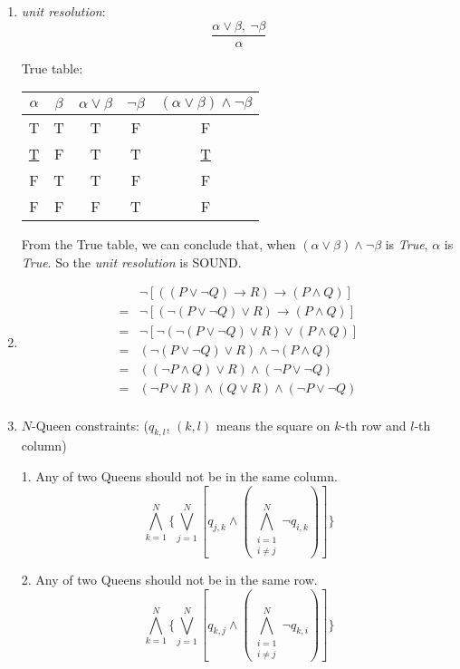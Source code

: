 \documentclass{article}
\begin{document}
\begin{enumerate}
\item \textit{unit resolution}: 
$$\frac{\alpha \lor \beta, \:\neg \beta}{\alpha}$$

True table: 
\begin{table}[ht]
\centering
\begin{tabular}{|c|c|c|c|c|}
\hline
$\alpha$ & $\beta$ & $\alpha \lor \beta$ & $\neg \beta$ & $(\alpha \lor \beta)\land \neg \beta$ \\ \hline
T & T & T & F & F \\ \hline
\underline{T} & F & T & T & \underline{T} \\ \hline
F & T & T & F & F \\ \hline
F & F & F & T & F \\ \hline
\end{tabular}
\end{table}

From the True table, we can conclude that, when $(\alpha \lor \beta)\land \neg \beta$ is \textit{True}, $\alpha$ is \textit{True}. So the \textit{unit resolution} is SOUND.

\item
\begin{align*}
& \neg [((P \lor \neg Q) \rightarrow R) \rightarrow (P \land Q)] \\
= & \neg [(\neg (P \lor \neg Q) \lor R) \rightarrow (P \land Q)] \\
= & \neg [\neg (\neg (P \lor \neg Q) \lor R) \lor (P \land Q)] \\
= & (\neg (P \lor \neg Q) \lor R) \land \neg (P \land Q) \\
= & ((\neg P \land Q) \lor R) \land (\neg P \lor \neg Q) \\
= & (\neg P \lor R) \land (Q \lor R) \land (\neg P \lor \neg Q) \\
\end{align*}


\item $N$-Queen constraints: ($q_{k,l}$, $(k,l)$ means the square on $k$-th row and $l$-th column)

1. Any of two Queens should not be in the same column.
$$ \bigwedge_{k=1}^{N}\{\bigvee_{j=1}^{N}[q_{j,k} \land (\bigwedge_{\substack{i=1\\i \neq j}}^{N} \neg q_{i,k})]\} $$

2. Any of two Queens should not be in the same row.
$$ \bigwedge_{k=1}^{N}\{\bigvee_{j=1}^{N}[q_{k,j} \land (\bigwedge_{\substack{i=1\\i \neq j}}^{N} \neg q_{k,i})]\} $$


\end{enumerate}
\end{document}
